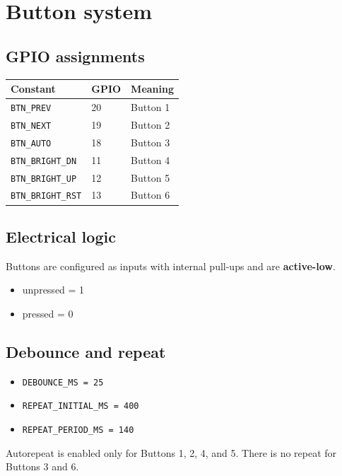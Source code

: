 \documentclass[11pt]{article}
\begin{document}
\section{Button system}
\subsection{GPIO assignments}
\begin{center}
\begin{tabular}{lll}
\toprule
Constant & GPIO & Meaning \\
\midrule
\texttt{BTN\_PREV} & 20 & Button 1 \\
\texttt{BTN\_NEXT} & 19 & Button 2 \\
\texttt{BTN\_AUTO} & 18 & Button 3 \\
\texttt{BTN\_BRIGHT\_DN} & 11 & Button 4 \\
\texttt{BTN\_BRIGHT\_UP} & 12 & Button 5 \\
\texttt{BTN\_BRIGHT\_RST} & 13 & Button 6 \\
\bottomrule
\end{tabular}
\end{center}

\subsection{Electrical logic}
Buttons are configured as inputs with internal pull-ups and are \textbf{active-low}.
\begin{itemize}
  \item unpressed = 1
  \item pressed = 0
\end{itemize}

\subsection{Debounce and repeat}
\begin{itemize}
  \item \texttt{DEBOUNCE\_MS = 25}
  \item \texttt{REPEAT\_INITIAL\_MS = 400}
  \item \texttt{REPEAT\_PERIOD\_MS = 140}
\end{itemize}

Autorepeat is enabled only for Buttons 1, 2, 4, and 5.
There is no repeat for Buttons 3 and 6.
\end{document}
